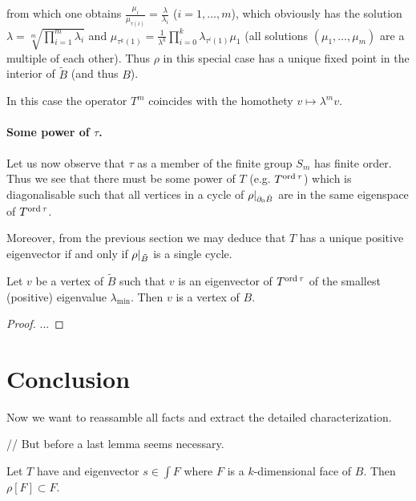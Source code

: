 \documentclass{article}
\begin{document}
from which one obtains $\frac{\mu_i}{\mu_{\tau(i)}}=\frac{\lambda}{\lambda_i}$ ($i=1,\ldots,m$), which obviously has the solution $\lambda = \sqrt[m]{\prod_{i=1}^m{\lambda_i}}$ 
and $\mu_{\tau^k(1)}=\frac{1}{\lambda^k}\prod_{i=0}^k{\lambda_{\tau^i(1)}}\mu_1$ (all solutions $(\mu_1,\ldots,\mu_m)$ are a multiple of each other). 
Thus $\rho$ in this special case has a unique fixed point in the interior of $\tilde{B}$ (and thus $B$).

\begin{remark}
In this case the operator $T^m$ coincides with the homothety $v\mapsto \lambda^m v$.
\end{remark}

\paragraph{Some power of $\tau$.}

Let us now observe that $\tau$ as a member of the finite group $S_m$ has finite order. Thus we see that there must be some power of $T$ (e.g. $T^{\operatorname{ord}\tau}$) which is diagonalisable such that all vertices in a cycle of $\rho\vert_{\partial_0 \tilde{B}}$ are in the same eigenspace of $T^{\operatorname{ord}{\tau}}$. 

Moreover, from the previous section we may deduce that $T$ has a unique positive eigenvector if and only if $\rho\vert_{\tilde{B}}$ is a single cycle.

\begin{lemma}\label{lem4} Let $v$ be a vertex of $\tilde{B}$ such that $v$ is an eigenvector of $T^{\operatorname{ord}\tau}$ of the smallest (positive) eigenvalue $\lambda_{\min}$. Then $v$ is a vertex of $B$. 

\end{lemma}

\begin{proof}
...
\end{proof}

\section{Conclusion}

Now we want to reassamble all facts and extract the detailed characterization.

//
But before a last lemma seems necessary.

\begin{lemma}\label{lem5}
Let $T$ have and eigenvector $s\in\int F$ where $F$ is a $k$-dimensional face of $B$. Then $\rho[F]\subset F$.
\end{lemma}
\end{document}
